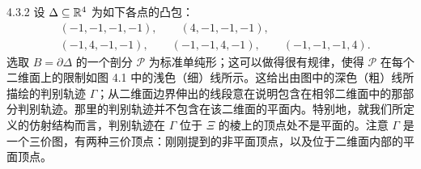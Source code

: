 \begin{example}{4.3.2}
设 $\Delta\subseteq\mathbb{R}^4$ 为如下各点的凸包：
\begin{align*}
&(-1,-1,-1,-1),\qquad (4,-1,-1,-1),\\
&(-1,4,-1,-1),\qquad (-1,-1,4,-1),\qquad (-1,-1,-1,4).
\end{align*}
选取 $B=\partial\Delta$ 的一个剖分 $\mathcal{P}$ 为标准单纯形；这可以做得很有规律，使得 $\mathcal{P}$ 在每个二维面上的限制如图 4.1 中的浅色（细）线所示。这给出由图中的深色（粗）线所描绘的判别轨迹 $\Gamma$；从二维面边界伸出的线段意在说明包含在相邻二维面中的那部分判别轨迹。那里的判别轨迹并不包含在该二维面的平面内。特别地，就我们所定义的仿射结构而言，判别轨迹在 $\Gamma$ 位于 $\Xi$ 的棱上的顶点处不是平面的。注意 $\Gamma$ 是一个三价图，有两种三价顶点：刚刚提到的非平面顶点，以及位于二维面内部的平面顶点。
\end{example}


